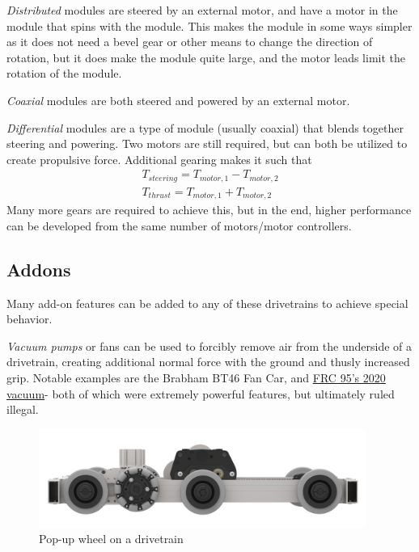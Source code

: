 \documentclass[10pt,letterpaper]{book}
\begin{document}
\begin{asparaenum}[a)]
	\item \textit{Distributed} modules are steered by an external motor, and have a motor in the module that spins with the module. This makes the module in some ways simpler as it does not need a bevel gear or other means to change the direction of rotation, but it does make the module quite large, and the motor leads limit the rotation of the module.
	\item \textit{Coaxial} modules are both steered and powered by an external motor.
	\item \textit{Differential} modules are a type of module (usually coaxial) that blends together steering and powering. Two motors are still required, but can both be utilized to create propulsive force. Additional gearing makes it such that
	\begin{align}
		T_{steering} = T_{motor, 1} - T_{motor, 2}\\
		T_{thrust}   = T_{motor, 1} + T_{motor, 2}
	\end{align}
	Many more gears are required to achieve this, but in the end, higher performance can be developed from the same number of motors/motor controllers.
\end{asparaenum}

\subsection{Addons}
Many add-on features can be added to any of these drivetrains to achieve special behavior.

\textit{Vacuum pumps} or fans can be used to forcibly remove air from the underside of a drivetrain, creating additional normal force with the ground and thusly increased grip. Notable examples are the Brabham BT46 Fan Car, and \href{https://www.youtube.com/watch?v=O9CEOHX88mw}{\color{red}\underline{FRC 95's 2020 vacuum}}- both of which were extremely powerful features, but ultimately ruled illegal. 

\begin{figure}[H]
	\includegraphics[width=0.95\textwidth]{imgs/drivetrain_popupwheel.png}
	\caption{Pop-up wheel on a drivetrain}
\end{figure}
\end{document}
